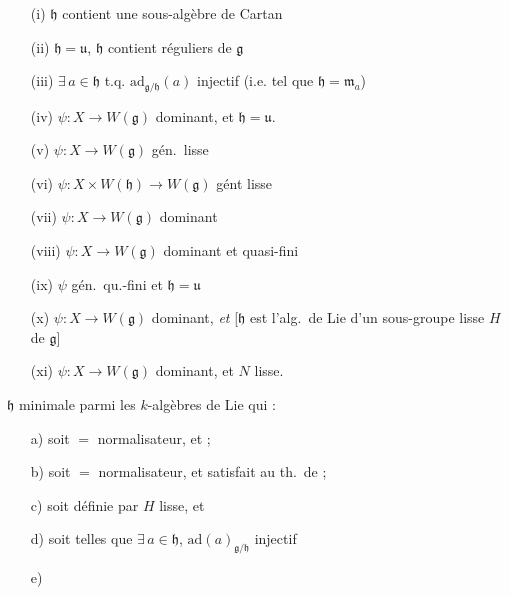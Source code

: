 \documentclass[11pt,a4paper]{article}
\begin{document}



\begin{itemize}
  \item[(i)] $\mathfrak{h}$ contient une sous-algèbre de Cartan
  \item[(ii)] $\mathfrak{h} = \mathfrak{u}$, $\mathfrak{h}$ contient
   réguliers de $\mathfrak{g}$
  \item[(iii)] $\exists\, a \in \mathfrak{h}$ t.q.
  $\mathrm{ad}_{\mathfrak{g}/\mathfrak{h}}(a)$ injectif (i.e.
  tel que \struck{\ill{}} $\mathfrak{h} = \mathfrak{m}_a$)
  \item[(iv)] $\psi : X \to W(\mathfrak{g})$ dominant, et $\mathfrak{h} =
  \mathfrak{u}$.
  \item[(v)] $\psi : X \to W(\mathfrak{g})$ gén.\ lisse
  \item[(vi)] $\psi : X \times W(\mathfrak{h}) \to W(\mathfrak{g})$
  gént lisse
  \item[(vii)] $\psi : X \to W(\mathfrak{g})$ dominant
  \item[(viii)] $\psi : X \to W(\mathfrak{g})$ dominant et quasi-fini
  \item[(ix)] $\psi$ gén.\ qu.-fini et $\mathfrak{h} = \mathfrak{u}$
  \item[(x)]   $\psi : X \to
  W(\mathfrak{g})$ dominant, \emph{et} [$\mathfrak{h}$ est l'alg.\ de Lie
  d'un sous-groupe lisse $H$ de $\mathfrak{g}$]
  \item[(xi)]  $\psi : X \to W(\mathfrak{g})$ dominant, et $N$
  lisse.
\end{itemize}

$\mathfrak{h}$ \struck{\ill{}} minimale parmi les $k$-algèbres de Lie qui \ill{} :

\begin{itemize}
  \item[a)] soit $=$ normalisateur, et 
  \ill{}  ;
  \item[b)] soit $=$ normalisateur, et satisfait au
  th.\ de \ill{}  ;
  \item[c)] soit définie par $H$ lisse, et
  \item[d)] soit telles que $\exists\, a \in \mathfrak{h}$,
  $\mathrm{ad}(a)_{\mathfrak{g}/\mathfrak{h}}$ injectif
  \item[e)] 
\end{itemize}
\end{document}
